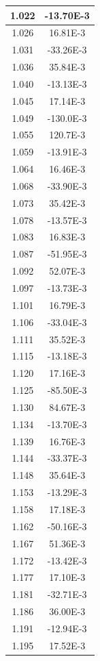 \documentclass[english, 12pt, a4paper]{ifimaster}
\begin{document}
\begin{appendices}
\begin{center}
\begin{longtable}[htbp]{|c|c|}
  1.022 & -13.70E-3 \\
\hline
  1.026 & 16.81E-3 \\
\hline
  1.031 & -33.26E-3 \\
\hline
  1.036 & 35.84E-3 \\
\hline
  1.040 & -13.13E-3 \\
\hline
  1.045 & 17.14E-3 \\
\hline
  1.049 & -130.0E-3 \\
\hline
  1.055 & 120.7E-3 \\
\hline
  1.059 & -13.91E-3 \\
\hline
  1.064 & 16.46E-3 \\
\hline
  1.068 & -33.90E-3 \\
\hline
  1.073 & 35.42E-3 \\
\hline
  1.078 & -13.57E-3 \\
\hline
  1.083 & 16.83E-3 \\
\hline
  1.087 & -51.95E-3 \\
\hline
  1.092 & 52.07E-3 \\
\hline
  1.097 & -13.73E-3 \\
\hline
  1.101 & 16.79E-3 \\
\hline
  1.106 & -33.04E-3 \\
\hline
  1.111 & 35.52E-3 \\
\hline
  1.115 & -13.18E-3 \\
\hline
  1.120 & 17.16E-3 \\
\hline
  1.125 & -85.50E-3 \\
\hline
  1.130 & 84.67E-3 \\
\hline
  1.134 & -13.70E-3 \\
\hline
  1.139 & 16.76E-3 \\
\hline
  1.144 & -33.37E-3 \\
\hline
  1.148 & 35.64E-3 \\
\hline
  1.153 & -13.29E-3 \\
\hline
  1.158 & 17.18E-3 \\
\hline
  1.162 & -50.16E-3 \\
\hline
  1.167 & 51.36E-3 \\
\hline
  1.172 & -13.42E-3 \\
\hline
  1.177 & 17.10E-3 \\
\hline
  1.181 & -32.71E-3 \\
\hline
  1.186 & 36.00E-3 \\
\hline
  1.191 & -12.94E-3 \\
\hline
  1.195 & 17.52E-3 \\
\hline
\end{longtable}
\end{center}




\end{appendices}
\end{document}
